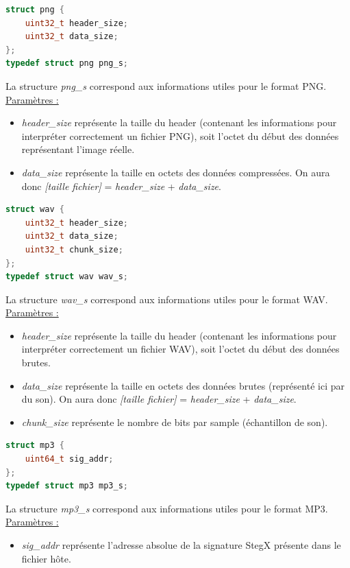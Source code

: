 \documentclass[11pt]{article}
\begin{document}
\begin{lstlisting}[language=c]
struct png {
    uint32_t header_size;
    uint32_t data_size;
};
typedef struct png png_s;
\end{lstlisting}

La structure \textit{png\_s} correspond aux informations 
utiles pour le format PNG.  
\newline
\underline{Paramètres :}
\begin{itemize}
\item \textit{header\_size} représente la taille du header (contenant les 
informations pour interpréter correctement un fichier PNG), soit l'octet 
du début des données représentant l'image réelle. 
\item \textit{data\_size} représente la taille en octets des données compressées. 
On aura donc 
\textit{[taille fichier]} = \textit{header\_size} + \textit{data\_size}.
\newline
\end{itemize}

\begin{lstlisting}[language=c]
struct wav {
    uint32_t header_size;
    uint32_t data_size;
    uint32_t chunk_size;
};
typedef struct wav wav_s;
\end{lstlisting}

La structure \textit{wav\_s} correspond aux informations 
utiles pour le format WAV.  
\newline
\underline{Paramètres :}
\begin{itemize}
\item \textit{header\_size} représente la taille du header (contenant les 
informations pour interpréter correctement un fichier WAV), soit l'octet 
du début des données brutes. 
\item \textit{data\_size} représente la taille en octets des données brutes 
(représenté ici par du son). On aura donc 
\textit{[taille fichier]} = \textit{header\_size} + \textit{data\_size}.
\item \textit{chunk\_size} représente le nombre de bits par sample (échantillon 
de son). 
\newline
\end{itemize}

\begin{lstlisting}[language=c]
struct mp3 {
    uint64_t sig_addr;
};
typedef struct mp3 mp3_s;
\end{lstlisting}

La structure \textit{mp3\_s} correspond aux informations 
utiles pour le format MP3.  
\newline
\underline{Paramètres :}
\begin{itemize}
\item \textit{sig\_addr} représente l'adresse absolue de la signature StegX 
présente dans le fichier hôte. 
\newline
\end{itemize}
\end{document}
